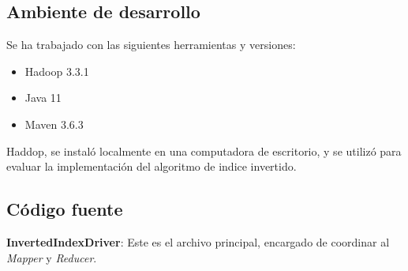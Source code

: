 \documentclass{article}
\begin{document}
\subsection{Ambiente de desarrollo}
Se ha trabajado con las siguientes herramientas y versiones:
\begin{itemize}
    \item Hadoop 3.3.1
    \item Java 11
    \item Maven 3.6.3
\end{itemize}

Haddop, se instaló localmente en una computadora de escritorio, y se utilizó para evaluar la implementación del algoritmo de indice invertido.


\subsection{Código fuente}


\textbf{InvertedIndexDriver}: Este es el archivo principal, encargado de coordinar al \textit{Mapper} y \textit{Reducer}.
\end{document}
